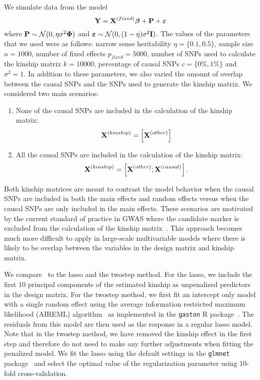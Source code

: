 We simulate data from the model 
\begin{equation}
\textbf{Y} = \textbf{X}^{(fixed)} \boldsymbol{\beta} + \mathbf{P} + \boldsymbol{\varepsilon}
\end{equation}
where $\mathbf{P}\sim \mathcal{N}(0, \eta \sigma^2 \boldsymbol{\Phi})$ and $\boldsymbol{\varepsilon} \sim \mathcal{N}(0, (1-\eta) \sigma^2 \textbf{I})$. The values of the parameters that we used were as follows: narrow sense heritability $\eta=\lbrace 0.1, 0.5 \rbrace$, sample size $n=1000$, number of fixed effects $p_{fixed} = 5000$, number of SNPs used to calculate the kinship matrix $k = 10000$, percentage of causal SNPs $c=\lbrace 0\%, 1\%\rbrace$ and $\sigma^2 = 1$. In addition to these parameters, we also varied the amount of overlap between the causal SNPs and the SNPs used to generate the kinship matrix. We considered two main scenarios:
\begin{enumerate}
	\item None of the causal SNPs are included in the calculation of the kinship matrix: $$\textbf{X}^{(kinship)} = \left[\textbf{X}^{(other)} \right]$$
	\item All the causal SNPs are included in the calculation of the kinship matrix: $$\textbf{X}^{(kinship)} = \left[\textbf{X}^{(other)} ; \textbf{X}^{(causal)}\right].$$
\end{enumerate}
Both kinship matrices are meant to contrast the model behavior when the causal SNPs are included in both the main effects and random effects versus when the causal SNPs are only included in the main effects. 
These scenarios are motivated by the current standard of practice in GWAS where the candidate marker is excluded from the calculation of the kinship matrix~\citep{lippert2011fast}. 
This approach becomes much more difficult to apply in large-scale multivariable models where there is likely to be overlap between the variables in the design matrix and kinship matrix. 

We compare \ggmix ~to the lasso and the twostep method. For the lasso, we include the first 10 principal components of the estimated kinship as unpenalized predictors in the design matrix. For the twostep method, we first fit an intercept only model with a single random effect using the average information restricted maximum likelihood (AIREML) algorithm~\citep{gilmour1995average} as implemented in the \texttt{gaston} R package~\citep{gaston}. The residuals from this model are then used as the response in a regular lasso model. Note that in the twostep method, we have removed the kinship effect in the first step and therefore do not need to make any further adjustments when fitting the penalized model. We fit the lasso using the default settings in the \texttt{glmnet} package~\citep{friedman2010regularization} and select the optimal value of the regularization parameter using 10-fold cross-validation.  

